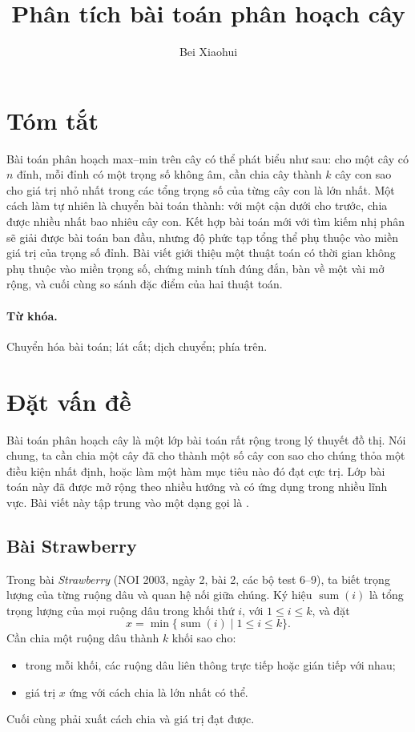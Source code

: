 \documentclass[11pt]{article}
\title{Phân tích bài toán phân hoạch cây}
\author{Bei Xiaohui}
\date{}
\begin{document}
\maketitle


\section*{Tóm tắt}

Bài toán phân hoạch max--min trên cây có thể phát biểu như sau: cho một cây
có $n$ đỉnh, mỗi đỉnh có một trọng số không âm, cần chia cây thành $k$ cây con
sao cho giá trị nhỏ nhất trong các tổng trọng số của từng cây con là lớn
nhất. Một cách làm tự nhiên là chuyển bài toán thành: với một cận dưới cho
trước, chia được nhiều nhất bao nhiêu cây con. Kết hợp bài toán mới với tìm
kiếm nhị phân sẽ giải được bài toán ban đầu, nhưng độ phức tạp tổng thể phụ
thuộc vào miền giá trị của trọng số đỉnh. Bài viết giới thiệu một thuật toán
có thời gian không phụ thuộc vào miền trọng số, chứng minh tính đúng đắn, bàn
về một vài mở rộng, và cuối cùng so sánh đặc điểm của hai thuật toán.

\paragraph{Từ khóa.}
Chuyển hóa bài toán; lát cắt; dịch chuyển; phía trên.

\section{Đặt vấn đề}

Bài toán phân hoạch cây là một lớp bài toán rất rộng trong lý thuyết đồ thị.
Nói chung, ta cần chia một cây đã cho thành một số cây con sao cho chúng thỏa
một điều kiện nhất định, hoặc làm một hàm mục tiêu nào đó đạt cực trị. Lớp bài
toán này đã được mở rộng theo nhiều hướng và có ứng dụng trong nhiều lĩnh
vực. Bài viết này tập trung vào một dạng gọi là .

\subsection{Bài Strawberry}

Trong bài \emph{Strawberry} (NOI 2003, ngày 2, bài 2, các bộ test 6--9), ta
biết trọng lượng của từng ruộng dâu và quan hệ nối giữa chúng. Ký hiệu
$\operatorname{sum}(i)$ là tổng trọng lượng của mọi ruộng dâu trong khối thứ
$i$, với $1\le i\le k$, và đặt
\[
  x=\min\{\operatorname{sum}(i)\mid 1\le i\le k\}.
\]
Cần chia một ruộng dâu thành $k$ khối sao cho:
\begin{itemize}
  \item trong mỗi khối, các ruộng dâu liên thông trực tiếp hoặc gián tiếp với
  nhau;
  \item giá trị $x$ ứng với cách chia là lớn nhất có thể.
\end{itemize}
Cuối cùng phải xuất cách chia và giá trị đạt được.
\end{document}
